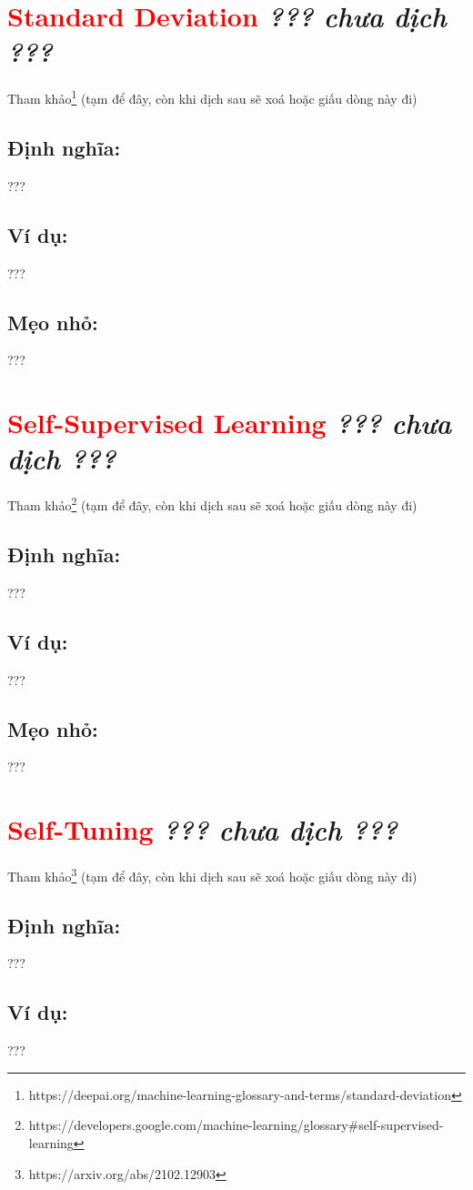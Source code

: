 \section*{\huge \textcolor{Red}{Standard Deviation}  \small \textit{??? chưa dịch ???} }
Tham khảo\footnote{https://deepai.org/machine-learning-glossary-and-terms/standard-deviation} (tạm để đây, còn khi dịch sau sẽ xoá hoặc giấu dòng này đi)
\subsection*{Định nghĩa:}
???
\subsection*{Ví dụ:}
???
\subsection*{Mẹo nhỏ:}
???
\section*{\huge \textcolor{Red}{Self-Supervised Learning}  \small \textit{??? chưa dịch ???} }
Tham khảo\footnote{https://developers.google.com/machine-learning/glossary\#self-supervised-learning} (tạm để đây, còn khi dịch sau sẽ xoá hoặc giấu dòng này đi)
\subsection*{Định nghĩa:}
???
\subsection*{Ví dụ:}
???
\subsection*{Mẹo nhỏ:}
???
\section*{\huge \textcolor{Red}{Self-Tuning}  \small \textit{??? chưa dịch ???} }
Tham khảo\footnote{https://arxiv.org/abs/2102.12903} (tạm để đây, còn khi dịch sau sẽ xoá hoặc giấu dòng này đi)
\subsection*{Định nghĩa:}
???
\subsection*{Ví dụ:}
???
